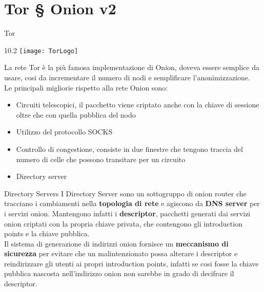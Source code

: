 \section{Tor § Onion v2}
\begin{frame}{Tor}
    \begin{wrapfigure}{1}{0.2\textwidth}
        \centering
        \texttt{[image: TorLogo]}
    \end{wrapfigure}

    La rete Tor è la più famosa implementazione di Onion, doveva essere semplice da usare, cosi da incrementare il numero di nodi e semplificare l'anonimizzazione. \\
    Le principali migliorie rispetto alla rete Onion sono:
    \begin{itemize}
        \item Circuiti telescopici, il pacchetto viene criptato anche con la chiave di sessione oltre che con quella pubblica del nodo 
        \item Utilizzo del protocollo SOCKS
        \item Controllo di congestione, consiste in due finestre che tengono traccia del numero di celle che possono transitare per un circuito
        \item Directory server
    \end{itemize}
\end{frame}

%         

\begin{frame}{Directory Servers} 
    I Directory Server sono un sottogruppo di onion router che tracciano i cambiamenti nella \textbf{topologia di rete} e agiscono da \textbf{DNS server} per i servizi onion.
    Mantengono infatti i \textbf{descriptor}, pacchetti generati dai servizi onion criptati con la propria chiave privata, che contengono gli introduction points e la chiave pubblica.\\
    
    Il sistema di generazione di indirizzi onion fornisce un \textbf{meccanismo di sicurezza} per evitare che un malintenzionato possa alterare i descriptor e reindirizzare gli utenti ai propri introduction points, infatti se cosi fosse la chiave pubblica nascosta nell'indirizzo onion non sarebbe in grado di decifrare il descriptor.
\end{frame}

